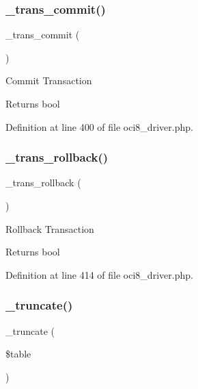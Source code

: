 \subsubsection{\texorpdfstring{\_trans\_commit()}{\_trans\_commit()}}
{\footnotesize\ttfamily \+\_\+trans\+\_\+commit (\begin{DoxyParamCaption}{ }\end{DoxyParamCaption})\hspace{0.3cm}{\ttfamily [protected]}}

Commit Transaction

\begin{DoxyReturn}{Returns}
bool 
\end{DoxyReturn}


Definition at line 400 of file oci8\+\_\+driver.\+php.

\mbox{\label{class_c_i___d_b__oci8__driver_ad49a116b0776c26b53114c9093fd102a}} 
\subsubsection{\texorpdfstring{\_trans\_rollback()}{\_trans\_rollback()}}
{\footnotesize\ttfamily \+\_\+trans\+\_\+rollback (\begin{DoxyParamCaption}{ }\end{DoxyParamCaption})\hspace{0.3cm}{\ttfamily [protected]}}

Rollback Transaction

\begin{DoxyReturn}{Returns}
bool 
\end{DoxyReturn}


Definition at line 414 of file oci8\+\_\+driver.\+php.

\mbox{\label{class_c_i___d_b__oci8__driver_aa029600528fc1ce660a23ff4b4667f95}} 
\subsubsection{\texorpdfstring{\_truncate()}{\_truncate()}}
{\footnotesize\ttfamily \+\_\+truncate (\begin{DoxyParamCaption}\item[{}]{\$table }\end{DoxyParamCaption})\hspace{0.3cm}{\ttfamily [protected]}}

